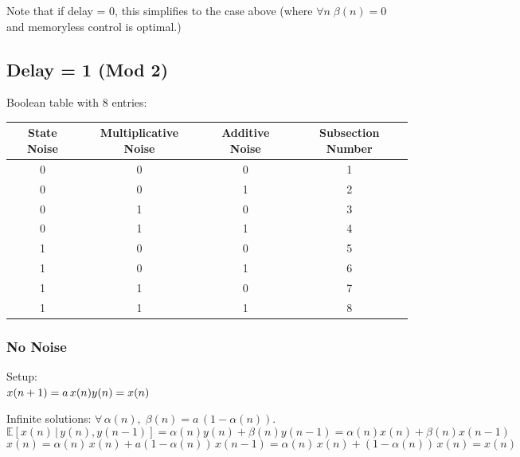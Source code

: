\documentclass[14pt]{extarticle}
\begin{document}
Note that if delay = 0, this simplifies to the case above (where $\forall n \; \beta(n) = 0$ and memoryless control is optimal.)

\subsection*{Delay = 1 (Mod 2)}

Boolean table with 8 entries:\\

{\centering
\begin{tabular}{cccc}
State Noise & Multiplicative Noise & Additive Noise & Subsection Number \\ \hline
0           & 0                    & 0              & 1                 \\
0           & 0                    & 1              & 2                 \\
0           & 1                    & 0              & 3                 \\
0           & 1                    & 1              & 4                 \\
1           & 0                    & 0              & 5                 \\
1           & 0                    & 1              & 6                 \\
1           & 1                    & 0              & 7                 \\
1           & 1                    & 1              & 8                
\end{tabular}}

\subsubsection{No Noise}
Setup: \\
\begin{math}
x(n+1) = a \, x(n) \\
y(n) = x(n) \\
\end{math}

Infinite solutions: $\forall \, \alpha(n), \; \beta(n) = a \, (1 - \alpha(n))$. 
\[ \mathbb{E}[x(n) \, | \, y(n), y(n-1) ] = \alpha(n) y(n) + \beta(n) y(n-1) = \alpha(n) x(n)  + \beta(n) x(n-1) \]
\[ \hat{x}(n) = \alpha(n) \, x(n) + a(1-\alpha(n)) \, x(n-1) = \alpha(n) \, x(n) + (1-\alpha(n)) \, x(n) = x(n) \]
\end{document}
